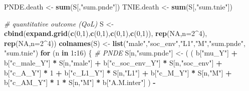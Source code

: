 \documentclass[
]{book}
\newenvironment{Shaded}{\begin{snugshade}}{\end{snugshade}}
\newcommand{\AttributeTok}[1]{\textcolor[rgb]{0.13,0.29,0.53}{#1}}
\newcommand{\CommentTok}[1]{\textcolor[rgb]{0.56,0.35,0.01}{\textit{#1}}}
\newcommand{\ConstantTok}[1]{\textcolor[rgb]{0.56,0.35,0.01}{#1}}
\newcommand{\ControlFlowTok}[1]{\textcolor[rgb]{0.13,0.29,0.53}{\textbf{#1}}}
\newcommand{\DecValTok}[1]{\textcolor[rgb]{0.00,0.00,0.81}{#1}}
\newcommand{\FunctionTok}[1]{\textcolor[rgb]{0.13,0.29,0.53}{\textbf{#1}}}
\newcommand{\NormalTok}[1]{#1}
\newcommand{\OtherTok}[1]{\textcolor[rgb]{0.56,0.35,0.01}{#1}}
\newcommand{\SpecialCharTok}[1]{\textcolor[rgb]{0.81,0.36,0.00}{\textbf{#1}}}
\newcommand{\StringTok}[1]{\textcolor[rgb]{0.31,0.60,0.02}{#1}}
\begin{document}
\begin{Shaded}
\begin{Highlighting}[]
\NormalTok{  PNDE.death }\OtherTok{\textless{}{-}} \FunctionTok{sum}\NormalTok{(S[,}\StringTok{"sum.pnde"}\NormalTok{])}
\NormalTok{  TNIE.death }\OtherTok{\textless{}{-}} \FunctionTok{sum}\NormalTok{(S[,}\StringTok{"sum.tnie"}\NormalTok{])}
  
  
  \CommentTok{\# quantitative outcome (QoL)}
\NormalTok{  S }\OtherTok{\textless{}{-}} \FunctionTok{cbind}\NormalTok{(}\FunctionTok{expand.grid}\NormalTok{(}\FunctionTok{c}\NormalTok{(}\DecValTok{0}\NormalTok{,}\DecValTok{1}\NormalTok{),}\FunctionTok{c}\NormalTok{(}\DecValTok{0}\NormalTok{,}\DecValTok{1}\NormalTok{),}\FunctionTok{c}\NormalTok{(}\DecValTok{0}\NormalTok{,}\DecValTok{1}\NormalTok{),}\FunctionTok{c}\NormalTok{(}\DecValTok{0}\NormalTok{,}\DecValTok{1}\NormalTok{)), }\FunctionTok{rep}\NormalTok{(}\ConstantTok{NA}\NormalTok{,}\AttributeTok{n=}\DecValTok{2}\SpecialCharTok{\^{}}\DecValTok{4}\NormalTok{), }\FunctionTok{rep}\NormalTok{(}\ConstantTok{NA}\NormalTok{,}\AttributeTok{n=}\DecValTok{2}\SpecialCharTok{\^{}}\DecValTok{4}\NormalTok{))}
  \FunctionTok{colnames}\NormalTok{(S) }\OtherTok{\textless{}{-}} \FunctionTok{list}\NormalTok{(}\StringTok{"male"}\NormalTok{,}\StringTok{"soc\_env"}\NormalTok{,}\StringTok{"L1"}\NormalTok{,}\StringTok{"M"}\NormalTok{,}\StringTok{"sum.pnde"}\NormalTok{, }\StringTok{"sum.tnie"}\NormalTok{)}
  \ControlFlowTok{for}\NormalTok{ (n }\ControlFlowTok{in} \DecValTok{1}\SpecialCharTok{:}\DecValTok{16}\NormalTok{) \{}
    \CommentTok{\# PNDE }
\NormalTok{    S[n,}\StringTok{"sum.pnde"}\NormalTok{] }\OtherTok{\textless{}{-}}\NormalTok{ ( ( b[}\StringTok{"mu\_Y"}\NormalTok{] }\SpecialCharTok{+} 
\NormalTok{                             b[}\StringTok{"c\_male\_Y"}\NormalTok{] }\SpecialCharTok{*}\NormalTok{ S[n,}\StringTok{"male"}\NormalTok{] }\SpecialCharTok{+} 
\NormalTok{                             b[}\StringTok{"c\_soc\_env\_Y"}\NormalTok{] }\SpecialCharTok{*}\NormalTok{ S[n,}\StringTok{"soc\_env"}\NormalTok{] }\SpecialCharTok{+} 
\NormalTok{                             b[}\StringTok{"c\_A\_Y"}\NormalTok{] }\SpecialCharTok{*} \DecValTok{1} \SpecialCharTok{+} 
\NormalTok{                             b[}\StringTok{"c\_L1\_Y"}\NormalTok{] }\SpecialCharTok{*}\NormalTok{ S[n,}\StringTok{"L1"}\NormalTok{] }\SpecialCharTok{+}
\NormalTok{                             b[}\StringTok{"c\_M\_Y"}\NormalTok{] }\SpecialCharTok{*}\NormalTok{ S[n,}\StringTok{"M"}\NormalTok{] }\SpecialCharTok{+}
\NormalTok{                             b[}\StringTok{"c\_AM\_Y"}\NormalTok{] }\SpecialCharTok{*} \DecValTok{1} \SpecialCharTok{*}\NormalTok{ S[n,}\StringTok{"M"}\NormalTok{] }\SpecialCharTok{*}\NormalTok{ b[}\StringTok{"A.M.inter"}\NormalTok{] ) }\SpecialCharTok{{-}} 

\end{Highlighting}
\end{Shaded}
\end{document}
